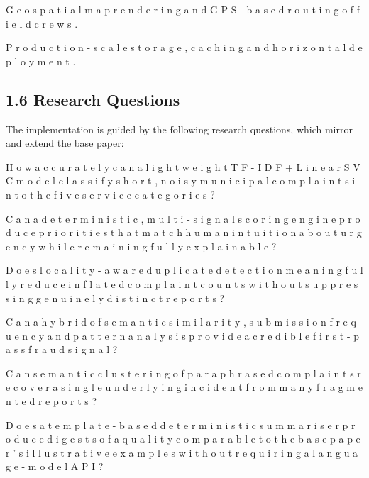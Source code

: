 \documentclass[10pt,letterpaper,oneside]{article}\usepackage{geometry}\geometry{top=1in,bottom=1in,left=1in,right=1in,includeheadfoot}\usepackage{xcolor}\definecolor{color@navy}{HTML}{1F3B63}\definecolor{color@grey}{HTML}{404040}\definecolor{color@hdr}{HTML}{F2F4F7}\usepackage{titlesec}\titleformat{\section}  {\normalfont\huge\bfseries\color@navy}  {}{0pt}{\MakeUppercase}\titleformat{\subsection}  {\normalfont\Large\bfseries\color@navy}  {}{0pt}{}\titleformat{\subsubsection}  {\normalfont\large\bfseries\color@navy}  {}{0pt}{}\titlespacing*{\section}{0pt}{14pt}{6pt}\titlespacing*{\subsection}{0pt}{10pt}{4pt}\titlespacing*{\subsubsection}{0pt}{8pt}{3pt}\setlength{\parindent}{0pt}\setlength{\parskip}{0.6em}\parindent=0pt\usepackage{enumitem}\setlist{nosep,leftmargin=*,itemsep=0pt,topsep=2pt,partopsep=0pt}\usepackage{array}\usepackage{booktabs}\usepackage{caption}\captionsetup{font={small,it},labelfont={bf},labelsep=period,  parskip=2pt,skip=4pt,list=no}\captionsetup[table]{labelfont={bf,small,color@navy},name=Table}\usepackage{graphicx}\usepackage{verbatim}\usepackage{ragged2e}\usepackage{longtable}\usepackage{tabularx}\usepackage{multirow}\usepackage{colortbl}\definecolor{rowshade}{HTML}{F2F4F7}\usepackage{tikz}\usetikzlibrary{positioning,calc}\usepackage[hidelinks]{hyperref}\hypersetup{colorlinks=true,linkcolor=color@navy,urlcolor=color@navy}\pagestyle{fancy}\fancyhf{}\renewcommand{\headrulewidth}{0.4pt}\fancyhead[L]{\small\color@navy CivicSense — Project Report}\fancyhead[R]{\small\color@grey October 11, 2026}\fancyfoot[C]{\small\color@grey An Integrated Intelligent Triage Pipelin}\fancyfoot[R]{\small\color@grey Page \thepage}\usepackage{setspace}\setstretch{1.15}\AtBeginDocument{  \hypersetup{pdftitle={An Integrated Intelligent Triage Pipeline for AI-Enhanced Citizen Complaint Management},    pdfauthor={CivicSense Project Team},    pdfsubject={Project Report},    pdfkeywords={smart cities, NLP, complaint management, e-governance},    pdfcreator={CivicSense Project Team}  }}
\begin{document}
\item G e o s p a t i a l   m a p   r e n d e r i n g   a n d   G P S - b a s e d   r o u t i n g   o f   f i e l d   c r e w s .

\item P r o d u c t i o n - s c a l e   s t o r a g e ,   c a c h i n g   a n d   h o r i z o n t a l   d e p l o y m e n t .

\subsection*{1.6 Research Questions}
The implementation is guided by the following research questions, which mirror and extend the base paper:

\item H o w   a c c u r a t e l y   c a n   a   l i g h t w e i g h t   T F - I D F   +   L i n e a r S V C   m o d e l   c l a s s i f y   s h o r t ,   n o i s y   m u n i c i p a l   c o m p l a i n t s   i n t o   t h e   f i v e   s e r v i c e   c a t e g o r i e s ?

\item C a n   a   d e t e r m i n i s t i c ,   m u l t i - s i g n a l   s c o r i n g   e n g i n e   p r o d u c e   p r i o r i t i e s   t h a t   m a t c h   h u m a n   i n t u i t i o n   a b o u t   u r g e n c y   w h i l e   r e m a i n i n g   f u l l y   e x p l a i n a b l e ?

\item D o e s   l o c a l i t y - a w a r e   d u p l i c a t e   d e t e c t i o n   m e a n i n g f u l l y   r e d u c e   i n f l a t e d   c o m p l a i n t   c o u n t s   w i t h o u t   s u p p r e s s i n g   g e n u i n e l y   d i s t i n c t   r e p o r t s ?

\item C a n   a   h y b r i d   o f   s e m a n t i c   s i m i l a r i t y ,   s u b m i s s i o n   f r e q u e n c y   a n d   p a t t e r n   a n a l y s i s   p r o v i d e   a   c r e d i b l e   f i r s t - p a s s   f r a u d   s i g n a l ?

\item C a n   s e m a n t i c   c l u s t e r i n g   o f   p a r a p h r a s e d   c o m p l a i n t s   r e c o v e r   a   s i n g l e   u n d e r l y i n g   i n c i d e n t   f r o m   m a n y   f r a g m e n t e d   r e p o r t s ?

\item D o e s   a   t e m p l a t e - b a s e d   d e t e r m i n i s t i c   s u m m a r i s e r   p r o d u c e   d i g e s t s   o f   a   q u a l i t y   c o m p a r a b l e   t o   t h e   b a s e   p a p e r ’ s   i l l u s t r a t i v e   e x a m p l e s   w i t h o u t   r e q u i r i n g   a   l a n g u a g e - m o d e l   A P I ?
\end{document}
